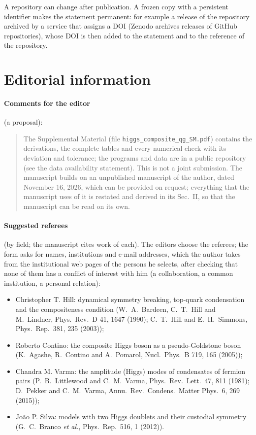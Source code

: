\documentclass[11pt]{article}
\begin{document}
A repository can change after publication. A frozen copy with a persistent identifier makes the statement permanent: for
example a release of the repository archived by a service that assigns a DOI (Zenodo archives releases of GitHub
repositories), whose DOI is then added to the statement and to the reference of the repository.

\section{Editorial information}
\label{sec:editorial}

\paragraph{Comments for the editor} (a proposal):
\begin{quote}
The Supplemental Material (file \texttt{higgs\_composite\_qg\_SM.pdf}) contains the derivations, the complete tables and
every numerical check with its deviation and tolerance; the programs and data are in a public repository (see the data
availability statement). This is not a joint submission. The manuscript builds on an unpublished manuscript of the author,
dated November 16, 2026, which can be provided on request; everything that the manuscript uses of it is restated and
derived in its Sec.~II, so that the manuscript can be read on its own.
\end{quote}

\paragraph{Suggested referees} (by field; the manuscript cites work of each). The editors choose the referees; the form
asks for names, institutions and e-mail addresses, which the author takes from the institutional web pages of the persons
he selects, after checking that none of them has a conflict of interest with him (a collaboration, a common institution,
a personal relation):
\begin{itemize}
\item Christopher T. Hill: dynamical symmetry breaking, top-quark condensation and the compositeness condition (W.~A.~Bardeen,
C.~T.~Hill and M.~Lindner, Phys.\ Rev.\ D 41, 1647 (1990); C.~T.~Hill and E.~H.~Simmons, Phys.\ Rep.\ 381, 235 (2003));
\item Roberto Contino: the composite Higgs boson as a pseudo-Goldstone boson (K.~Agashe, R.~Contino and A.~Pomarol, Nucl.\
Phys.\ B 719, 165 (2005));
\item Chandra M. Varma: the amplitude (Higgs) modes of condensates of fermion pairs (P.~B.~Littlewood and C.~M.~Varma,
Phys.\ Rev.\ Lett.\ 47, 811 (1981); D.~Pekker and C.~M.~Varma, Annu.\ Rev.\ Condens.\ Matter Phys.\ 6, 269 (2015));
\item Jo\~ao P. Silva: models with two Higgs doublets and their custodial symmetry (G.~C.~Branco \emph{et al.}, Phys.\
Rep.\ 516, 1 (2012)).
\end{itemize}
\end{document}
